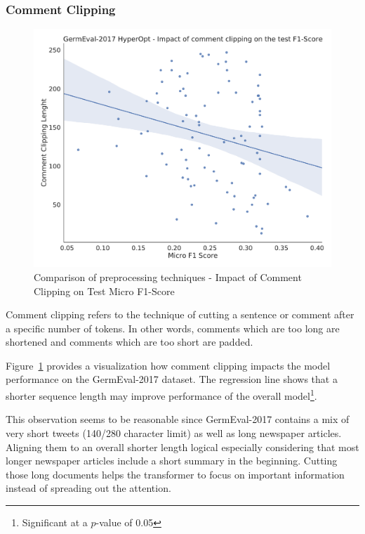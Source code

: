 \subsubsection{Comment Clipping}
\label{subsec:06_CommentClipping}

\begin{figure}
	\centering
	\includegraphics[width=\textwidth]{figures/06_results/06_hp_ge_lm_commentClipping_test}
	\caption{Comparison of preprocessing techniques - Impact of Comment Clipping on Test Micro F1-Score}
	\label{fig:06_PreprocessingCommentClipping}
\end{figure}

Comment clipping refers to the technique of cutting a sentence or comment after a specific number of tokens. In other words, comments which are too long are shortened and comments which are too short are padded.

Figure~\ref{fig:06_PreprocessingCommentClipping} provides a visualization how comment clipping impacts the model performance on the GermEval-2017 dataset. The regression line shows that a shorter sequence length may improve performance of the overall model\footnote{Significant at a $p$-value of 0.05}.
\medskip

This observation seems to be reasonable since GermEval-2017 contains a mix of very short tweets {(140/280 character limit)} as well as long newspaper articles. Aligning them to an overall shorter length logical especially considering that most longer newspaper articles include a short summary in the beginning. Cutting those long documents helps the transformer to focus on important information instead of spreading out the attention.

